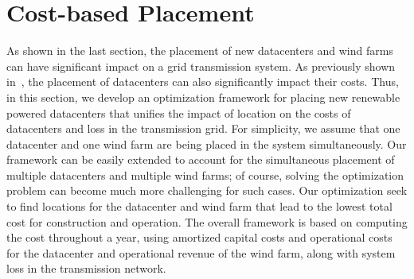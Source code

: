 \section{Cost-based Placement}
\label{sec:framework}

As shown in the last section, the placement of new datacenters and wind farms can have significant impact on a grid transmission system.  As previously shown in~\cite{berral2014building,Goiri11place}, the placement of datacenters can also significantly impact their costs.  Thus, in this section, we develop an optimization framework for placing new renewable powered datacenters that unifies the impact of location on the costs of datacenters and loss in the transmission grid.  For simplicity, we assume that one datacenter and one wind farm are being placed in the system simultaneously.  Our framework can be easily extended to account for the simultaneous placement of multiple datacenters and multiple wind farms; of course, solving the optimization problem can become much more challenging for such cases.  Our optimization seek to find locations for the datacenter and wind farm that lead to the lowest total cost for construction and operation.  The overall framework is based on computing the cost throughout a year, using amortized capital costs and operational costs for the datacenter and operational revenue of the wind farm, along with system loss in the transmission network.


